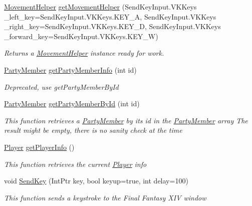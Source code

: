 \begin{DoxyCompactItemize}
\item 
\hyperlink{classffxivlib_1_1_movement_helper}{Movement\-Helper} \hyperlink{classffxivlib_1_1_f_f_x_i_v_l_i_b_a1032d39df92490bb83d6c40361accd77}{get\-Movement\-Helper} (Send\-Key\-Input.\-V\-K\-Keys \-\_\-left\-\_\-key=Send\-Key\-Input.\-V\-K\-Keys.\-K\-E\-Y\-\_\-\-A, Send\-Key\-Input.\-V\-K\-Keys \-\_\-right\-\_\-key=Send\-Key\-Input.\-V\-K\-Keys.\-K\-E\-Y\-\_\-\-D, Send\-Key\-Input.\-V\-K\-Keys \-\_\-forward\-\_\-key=Send\-Key\-Input.\-V\-K\-Keys.\-K\-E\-Y\-\_\-\-W)
\begin{DoxyCompactList}\small\item\em Returns a \hyperlink{classffxivlib_1_1_movement_helper}{Movement\-Helper} instance ready for work. \end{DoxyCompactList}\item 
\hyperlink{classffxivlib_1_1_party_member}{Party\-Member} \hyperlink{classffxivlib_1_1_f_f_x_i_v_l_i_b_a8cd7985eb9beb13c092ae1ed5f21c9f8}{get\-Party\-Member\-Info} (int id)
\begin{DoxyCompactList}\small\item\em Deprecated, use get\-Party\-Member\-By\-Id \end{DoxyCompactList}\item 
\hyperlink{classffxivlib_1_1_party_member}{Party\-Member} \hyperlink{classffxivlib_1_1_f_f_x_i_v_l_i_b_a1f853ba79ff05b1f4bc9d20470071075}{get\-Party\-Member\-By\-Id} (int id)
\begin{DoxyCompactList}\small\item\em This function retrieves a \hyperlink{classffxivlib_1_1_party_member}{Party\-Member} by its id in the \hyperlink{classffxivlib_1_1_party_member}{Party\-Member} array The result might be empty, there is no sanity check at the time \end{DoxyCompactList}\item 
\hyperlink{classffxivlib_1_1_player}{Player} \hyperlink{classffxivlib_1_1_f_f_x_i_v_l_i_b_aaf42ae8d84f170a0f18207369fb8e1a9}{get\-Player\-Info} ()
\begin{DoxyCompactList}\small\item\em This function retrieves the current \hyperlink{classffxivlib_1_1_player}{Player} info \end{DoxyCompactList}\item 
void \hyperlink{classffxivlib_1_1_f_f_x_i_v_l_i_b_ac4d88c5b015e78af8455be0bef6f3aca}{Send\-Key} (Int\-Ptr key, bool keyup=true, int delay=100)
\begin{DoxyCompactList}\small\item\em This function sends a keystroke to the Final Fantasy X\-I\-V window \end{DoxyCompactList}\item 

\end{DoxyCompactItemize}
